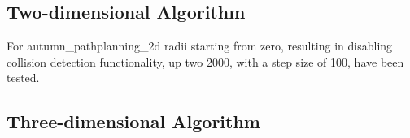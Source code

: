 \subsection{Two-dimensional Algorithm}

For autumn\_pathplanning\_2d radii starting from zero, resulting in disabling collision detection functionality, up two 2000, with a step size of 100, have been tested. 



\subsection{Three-dimensional Algorithm}


